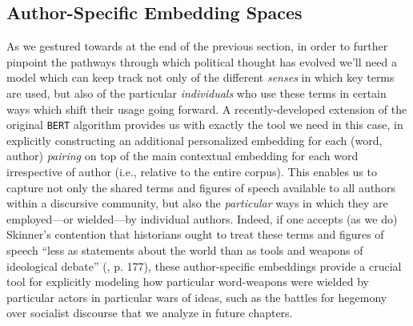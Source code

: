 \documentclass[11pt]{article}
\newcommand{\BERT}[0]{\texttt{BERT}}
\newcommand{\jj}[1]{***[\textbf{#1}]***}
\begin{document}
\subsection{Author-Specific Embedding Spaces}\label{sec:auth-embeddings}

As we gestured towards at the end of the previous section, in order to further pinpoint the pathways through which political thought has evolved we'll need a model which can  keep track not only of the different \textit{senses} in which key terms are used, but also of the particular \textit{individuals} who use these terms in certain ways which shift their usage going forward. A recently-developed extension of the original \BERT{} algorithm \parencite{welch_exploring_2020} provides us with exactly the tool we need in this case, in explicitly constructing an additional personalized embedding for each (word, author) \textit{pairing} on top of the main contextual embedding for each word irrespective of author (i.e., relative to the entire corpus). This enables us to capture not only the shared terms and figures of speech available to all authors within a discursive community, but also the \textit{particular} ways in which they are employed---or wielded---by individual authors. Indeed, if one accepts (as we do) Skinner's contention that historians ought to treat these terms and figures of speech ``less as statements about the world than as tools and weapons of ideological debate'' (\cite{skinner_visions_2012}, p. 177), these author-specific embeddings provide a crucial tool for explicitly modeling how particular word-weapons were wielded by particular actors in particular wars of ideas, such as the battles for hegemony over socialist discourse that we analyze in future chapters.




\end{document}
